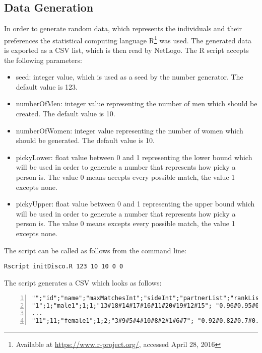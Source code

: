 \clearpage
\subsection{Data Generation}
In order to generate random data, which represents the individuals and their preferences the statistical computing language R\footnote{Available at \url{https://www.r-project.org/}, accessed April 28, 2016} was used. 
The generated data is exported as a CSV list, which is then read by NetLogo. 
The R script accepts the following parameters:
\begin{itemize}
	\item seed: integer value, which is used as a seed by the number generator. The default value is 123.
	\item numberOfMen: integer value representing the number of men which should be created. The default value is 10.
	\item numberOfWomen: integer value representing the number of women which should be generated. The default value is 10.
	\item pickyLower: float value between 0 and 1 representing the lower bound which will be used in order to generate a number that represents how picky a person is. The value 0 means accepts every possible match, the value 1 excepts none.
	\item pickyUpper: float value between 0 and 1 representing the upper bound which will be used in order to generate a number that represents how picky a person is. The value 0 means excepts every possible match, the value 1 excepts none.
\end{itemize}

The script can be called as follows from the command line: 
\begin{verbatim}
Rscript initDisco.R 123 10 10 0 0
\end{verbatim}

The script generates a CSV which looks as follows:
\begin{lstlisting}[numbers=left, breaklines=true] 
"";"id";"name";"maxMatchesInt";"sideInt";"partnerList";"rankList"
"1";1;"male1";1;1;"13#18#14#17#16#11#20#19#12#15"; "0.96#0.95#0.9#0.68#0.57#0.45#0.33#0.25#0.1#0.04"
...
"11";11;"female1";1;2;"3#9#5#4#10#8#2#1#6#7"; "0.92#0.82#0.7#0.67#0.48#0.41#0.35#0.25#0.22#0.05"
\end{lstlisting}

\clearpage
